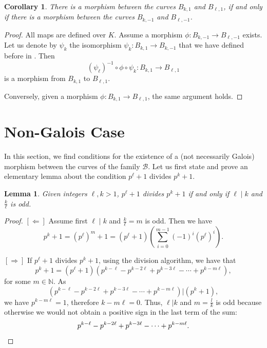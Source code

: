 \documentclass[oneside,a4paper,12pt]{article}
\newcommand{\N}{{\mathbb{N}}} %
\theoremstyle{plain} %
\newtheorem{lemma}[theorem]{Lemma}
\newtheorem{corollary}[theorem]{Corollary}
\theoremstyle{definition} %
\begin{document}
\begin{corollary}\label{morphismiff}
    There is a  morphism between the curves $B_{k,1}$ and $B_{\ell, 1}$, if and only if
    there is a  morphism between the curves $B_{k,-1}$ and $B_{\ell, -1}$.
\end{corollary}

\begin{proof}
All maps are defined over $K$.
    Assume a  morphism $\phi: B_{k,-1} \longrightarrow B_{\ell,-1}$ exists. 
    Let us denote by $\psi_k$ the isomorphism
    $\psi_k : B_{k,1}\longrightarrow B_{k,-1}$   that we have defined before in . Then 
    $$(\psi_\ell)^{-1}\circ \phi \circ \psi_k: B_{k,1} \longrightarrow B_{\ell,1}$$ is a morphism from $B_{k,1}$ to $B_{\ell,1}$. 

    Conversely, given a  morphism $\phi: B_{k,1} \longrightarrow B_{\ell,1}$, the same argument holds.
\end{proof}

\section{Non-Galois Case }\label{maint}

In this  section, we find conditions for the existence of a (not necessarily Galois)
morphism between the curves of the family $\mathcal{B}$. 
Let us first state and prove an elementary lemma about the condition 
$p^\ell+1$ divides $p^{k}+1$.

\begin{lemma}\label{lem:divisibility cond}
    Given integers $\ell, k >1$, $p^\ell+1$ divides $p^{k}+1$ if and only if $\ell \mid k$ and $\frac{k}{\ell}$ is odd.
\end{lemma}

\begin{proof}

    $[\Leftarrow]$ Assume first $\ell\mid k$ and $\frac{k}{\ell}=m$ is odd. Then we have 
    \[
    p^k+1 = (p^{\ell})^m +1=(p^{\ell}+1)\left(\sum_{i=0}^{m-1} (-1)^i(p^{\ell})^i\right). 
    \]
    
    $[\Rightarrow]$ If  $p^\ell+1$ divides $p^{k}+1$, using the division algorithm, we have that 
    \[
    p^k+1 = (p^\ell+1)(p^{k-\ell} - p^{k-2\ell} + p^{k-3\ell} - \cdots + p^{k-m\ell}),
    \]
    for some $m\in \N$. As
    \[
    (p^{k-\ell} - p^{k-2\ell} + p^{k-3\ell} - \cdots + p^{k-m\ell}) | (p^k+1),
    \] 
    we have $p^{k-m\ell}=1$, therefore $k-m\ell = 0$. Thus, $\ell|k$ and $m=\frac{l}{k}$ is odd because otherwise we would not obtain a positive sign in the last term of the sum: 
    \[
    p^{k-\ell} - p^{k-2\ell} + p^{k-3\ell} - \cdots + p^{k-m\ell}. \qedhere
    \]
\end{proof}
\end{document}
